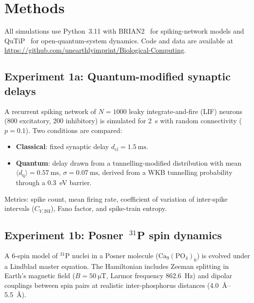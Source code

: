 \documentclass[twocolumn,11pt]{article}
\newcommand{\CVISI}{C_{\!V,\mathrm{ISI}}}
\begin{document}
\section{Methods}
\label{sec:methods}

All simulations use Python~3.11 with BRIAN2~\cite{Stimberg2019}
for spiking-network models and
QuTiP~\cite{Johansson2012,Johansson2013} for open-quantum-system
dynamics.  Code and data are available at
\url{https://github.com/unearthlyimprint/Biological-Computing}.

\subsection{Experiment 1a: Quantum-modified synaptic delays}
\label{sec:meth-1a}

A recurrent spiking network of $N = 1000$ leaky integrate-and-fire
(LIF) neurons (800 excitatory, 200 inhibitory) is simulated
for \SI{2}{\second} with random connectivity ($p = 0.1$).
Two conditions are compared:

\begin{itemize}
  \item \textbf{Classical}: fixed synaptic delay
    $d_{\mathrm{cl}} = \SI{1.5}{\milli\second}$.
  \item \textbf{Quantum}: delay drawn from a
    tunnelling-modified distribution with mean
    $\langle d_{\mathrm{q}} \rangle = \SI{0.57}{\milli\second}$,
    $\sigma = \SI{0.07}{\milli\second}$, derived from a
    WKB tunnelling probability through a
    \SI{0.3}{\electronvolt} barrier.
\end{itemize}

Metrics: spike count, mean firing rate, coefficient of variation
of inter-spike intervals ($\CVISI$), Fano factor, and
spike-train entropy.

\subsection{Experiment 1b: Posner~$^{31}$P spin dynamics}
\label{sec:meth-1b}

A 6-spin model of $^{31}$P nuclei in a Posner molecule
($\mathrm{Ca_9(PO_4)_6}$) is evolved under a Lindblad master
equation.  The Hamiltonian includes Zeeman splitting in Earth's
magnetic field ($B = \SI{50}{\micro\tesla}$, Larmor frequency
\SI{862.6}{\hertz}) and dipolar couplings between spin pairs at
realistic inter-phosphorus distances
(\SIrange{4.0}{5.5}{\angstrom}).
\end{document}
